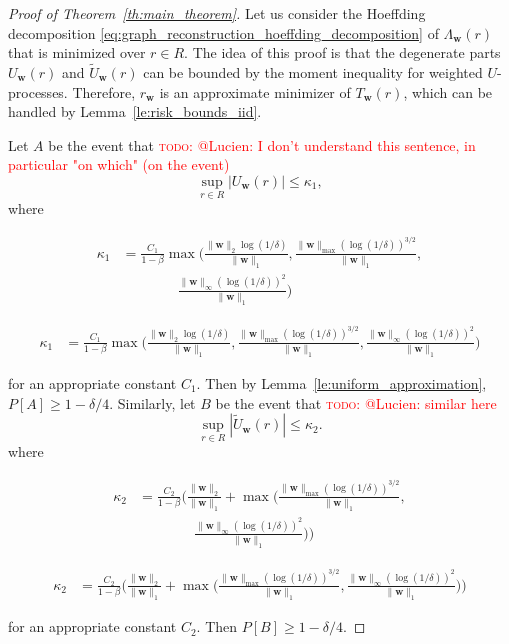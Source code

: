 \documentclass[letterpaper]{article} %
\def\DoubleColumn{}
\def\DoubleColumnEnd{}
\def\SingleColumn{}
\def\SingleColumnEnd{}
\newcommand{\Pro}{P}
\newcommand{\weight}{\mathbf{w}}
\newcommand{\normo}[1]{\|#1\|_1}
\newcommand{\complexbound}{\beta}
\newcommand{\red}[1]{\textcolor{red}{#1}}
\newcommand{\todo}[1]{\red{\textsc{todo:} #1}}
\begin{document}
\begin{proof}[Proof of Theorem~\ref{th:main_theorem}]
    Let us consider the Hoeffding decomposition \eqref{eq:graph_reconstruction_hoeffding_decomposition} of $\Lambda_\weight{}(r)$ that is minimized over $r\in R$. The idea of this proof is that the degenerate parts $U_\weight{}(r)$ and $\widetilde{U}_\weight{}(r)$ can be bounded by the moment inequality for weighted $U$-processes. Therefore, $r_\weight{}$ is an approximate minimizer of $T_\weight{}(r)$, which can be handled by Lemma~\ref{le:risk_bounds_iid}.

    Let $A$ be the event that
    \todo{@Lucien: I don't understand this sentence, in particular "on which" (on the event)}
    \[\sup_{r\in R}|U_\weight{}(r)|\le \kappa_1,\]
    where
    \DoubleColumn
    \begin{align*}
    \kappa_1&=\frac{C_1}{1-\complexbound{}}\max\Big(\frac{\|\weight{}\|_2\log(1/\delta)}{\normo{\weight{}}},\frac{\|\weight{}\|_{\max}(\log(1/\delta))^{3/2}}{\normo{\weight{}}},\\
    &\qquad\qquad \frac{\|\weight{}\|_\infty(\log(1/\delta))^2}{\normo{\weight{}}}\Big)
    \end{align*}
    \DoubleColumnEnd
    \SingleColumn
    \begin{align*}
    \kappa_1&=\frac{C_1}{1-\complexbound{}}\max\Big(\frac{\|\weight{}\|_2\log(1/\delta)}{\normo{\weight{}}},\frac{\|\weight{}\|_{\max}(\log(1/\delta))^{3/2}}{\normo{\weight{}}}, \frac{\|\weight{}\|_\infty(\log(1/\delta))^2}{\normo{\weight{}}}\Big)
    \end{align*}
    \SingleColumnEnd
    for an appropriate constant $C_1$. Then by Lemma~\ref{le:uniform_approximation}, $\Pro[A]\ge 1-\delta/4$. Similarly, let $B$ be the event that
    \todo{@Lucien: similar here}
    \[\sup_{r\in R}|\widetilde{U}_\weight{}(r)|\le \kappa_2.\]
    where
    \DoubleColumn
    \begin{align*}
    \kappa_2&=\frac{C_2}{1-\complexbound{}}\Bigg(\frac{\|\weight{}\|_2}{\normo{\weight{}}}+\max\Big(\frac{\|\weight{}\|_{\max}(\log(1/\delta))^{3/2}}{\normo{\weight{}}},\\
    &\qquad\qquad\frac{\|\weight{}\|_\infty(\log(1/\delta))^2}{\normo{\weight{}}}\Big)\Bigg)
    \end{align*}
    \DoubleColumnEnd
    \SingleColumn
    \begin{align*}
    \kappa_2&=\frac{C_2}{1-\complexbound{}}\Bigg(\frac{\|\weight{}\|_2}{\normo{\weight{}}}+\max\Big(\frac{\|\weight{}\|_{\max}(\log(1/\delta))^{3/2}}{\normo{\weight{}}},\frac{\|\weight{}\|_\infty(\log(1/\delta))^2}{\normo{\weight{}}}\Big)\Bigg)
    \end{align*}
    \SingleColumnEnd
    for an appropriate constant $C_2$.
    Then $\Pro[B]\ge 1-\delta/4$.


\end{proof}
\end{document}
